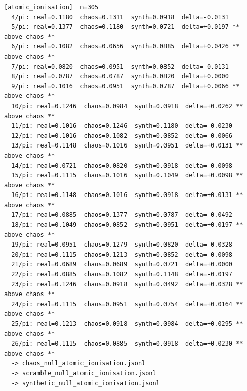 \documentclass[11pt, letterpaper, openany]{book}
\begin{document}
\begin{empiricalbox}
\begin{lstlisting}[style=terminal]
[atomic_ionisation]  n=305
  4/pi: real=0.1180  chaos=0.1311  synth=0.0918  delta=-0.0131
  5/pi: real=0.1377  chaos=0.1180  synth=0.0721  delta=+0.0197 ** above chaos **
  6/pi: real=0.1082  chaos=0.0656  synth=0.0885  delta=+0.0426 ** above chaos **
  7/pi: real=0.0820  chaos=0.0951  synth=0.0852  delta=-0.0131
  8/pi: real=0.0787  chaos=0.0787  synth=0.0820  delta=+0.0000
  9/pi: real=0.1016  chaos=0.0951  synth=0.0787  delta=+0.0066 ** above chaos **
  10/pi: real=0.1246  chaos=0.0984  synth=0.0918  delta=+0.0262 ** above chaos **
  11/pi: real=0.1016  chaos=0.1246  synth=0.1180  delta=-0.0230
  12/pi: real=0.1016  chaos=0.1082  synth=0.0852  delta=-0.0066
  13/pi: real=0.1148  chaos=0.1016  synth=0.0951  delta=+0.0131 ** above chaos **
  14/pi: real=0.0721  chaos=0.0820  synth=0.0918  delta=-0.0098
  15/pi: real=0.1115  chaos=0.1016  synth=0.1049  delta=+0.0098 ** above chaos **
  16/pi: real=0.1148  chaos=0.1016  synth=0.0918  delta=+0.0131 ** above chaos **
  17/pi: real=0.0885  chaos=0.1377  synth=0.0787  delta=-0.0492
  18/pi: real=0.1049  chaos=0.0852  synth=0.0951  delta=+0.0197 ** above chaos **
  19/pi: real=0.0951  chaos=0.1279  synth=0.0820  delta=-0.0328
  20/pi: real=0.1115  chaos=0.1213  synth=0.0852  delta=-0.0098
  21/pi: real=0.0689  chaos=0.0689  synth=0.0721  delta=+0.0000
  22/pi: real=0.0885  chaos=0.1082  synth=0.1148  delta=-0.0197
  23/pi: real=0.1246  chaos=0.0918  synth=0.0492  delta=+0.0328 ** above chaos **
  24/pi: real=0.1115  chaos=0.0951  synth=0.0754  delta=+0.0164 ** above chaos **
  25/pi: real=0.1213  chaos=0.0918  synth=0.0984  delta=+0.0295 ** above chaos **
  26/pi: real=0.1115  chaos=0.0885  synth=0.0918  delta=+0.0230 ** above chaos **
  -> chaos_null_atomic_ionisation.jsonl
  -> scramble_null_atomic_ionisation.jsonl
  -> synthetic_null_atomic_ionisation.jsonl


\end{lstlisting}
\end{empiricalbox}
\end{document}
